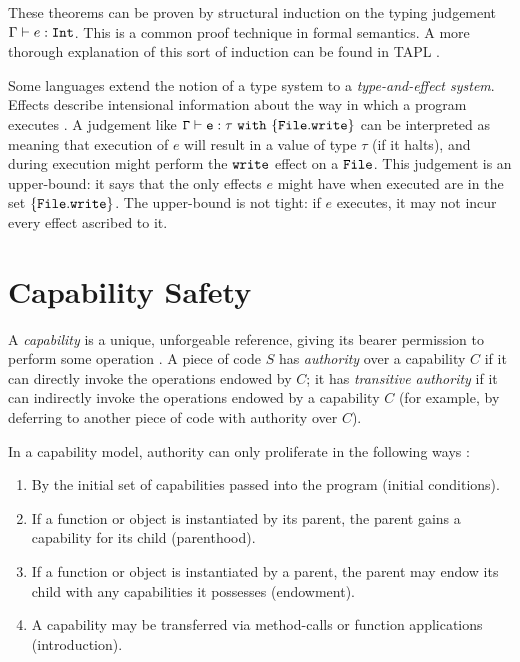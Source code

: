 These theorems can be proven by structural induction on the typing judgement $\Gamma \vdash e: \mathtt{Int}$. This is a common proof technique in formal semantics. A more thorough explanation of this sort of induction can be found in TAPL \cite[p. 31]{tapl}.

Some languages extend the notion of a type system to a \textit{type-and-effect system}. Effects describe intensional information about the way in which a program executes \cite{nielson99}. A judgement like $\mathtt{\Gamma \vdash e: \tau~\mathtt{with}~ \{ File.write \}}$ can be interpreted as meaning that execution of $e$ will result in a value of type $\tau$ (if it halts), and during execution might perform the $\mathtt{write}$ effect on a $\mathtt{File}$. This judgement is an upper-bound: it says that the only effects $e$ might have when executed are in the set $\{ \mathtt{File.write} \}$. The upper-bound is not tight: if $e$ executes, it may not incur every effect ascribed to it.


\section{Capability Safety}

A \textit{capability} is a unique, unforgeable reference, giving its bearer permission to perform some operation \cite{dennis66}. A piece of code $S$ has \textit{authority} over a capability $C$ if it can directly invoke the operations endowed by $C$; it has \textit{transitive authority} if it can indirectly invoke the operations endowed by a capability $C$ (for example, by deferring to another piece of code with authority over $C$).

In a capability model, authority can only proliferate in the following ways \cite{miller06}:

\begin{enumerate}
	\item By the initial set of capabilities passed into the program (initial conditions).
	\item If a function or object is instantiated by its parent, the parent gains a capability for its child (parenthood).
	\item If a function or object is instantiated by a parent, the parent may endow its child with any capabilities it possesses (endowment).
	\item A capability may be transferred via method-calls or function applications (introduction).
\end{enumerate}

